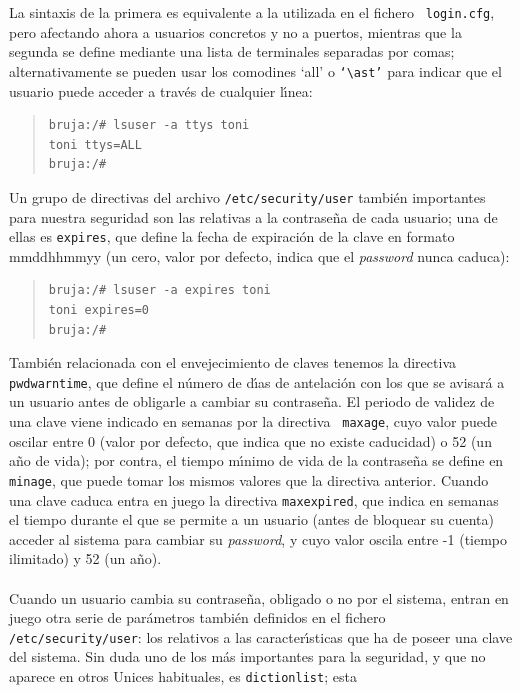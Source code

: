 La sintaxis de la primera es equivalente a la utilizada en el fichero {\tt 
login.cfg}, pero afectando ahora a usuarios concretos y no a puertos, mientras
que la segunda se define mediante una lista de terminales separadas por comas;
alternativamente se pueden usar los comodines {\sc `all'} o {\tt `$\ast$'} para
indicar que el usuario puede acceder a trav\'es de cualquier l\'{\i}nea:
\begin{quote}
\begin{verbatim}
bruja:/# lsuser -a ttys toni
toni ttys=ALL
bruja:/#
\end{verbatim}
\end{quote}
Un grupo de directivas del archivo {\tt /etc/security/user} tambi\'en 
importantes para nuestra seguridad son las relativas a la contrase\~na de cada
usuario; una de ellas es {\tt expires}, que define la fecha de expiraci\'on de
la clave en formato {\sc mmddhhmmyy} (un cero, valor por defecto, indica que el 
{\it password} nunca caduca):
\begin{quote}
\begin{verbatim}
bruja:/# lsuser -a expires toni
toni expires=0
bruja:/#
\end{verbatim}
\end{quote}
Tambi\'en relacionada con el envejecimiento de claves tenemos la directiva
{\tt pwdwarntime}, que define el n\'umero de d\'{\i}as de antelaci\'on con los 
que se avisar\'a a un usuario antes de obligarle a cambiar su contrase\~na. El
periodo de validez de una clave viene indicado en semanas por la directiva {\tt 
maxage}, cuyo valor puede oscilar entre 0 (valor por defecto, que indica que no 
existe caducidad) o 52 (un a\~no de vida); por contra, el tiempo m\'{\i}nimo de 
vida de la contrase\~na se define en {\tt minage}, que puede tomar los mismos 
valores que la directiva anterior. Cuando una clave caduca entra en juego la
directiva {\tt maxexpired}, que indica en semanas el tiempo durante el que se
permite a un usuario (antes de bloquear su cuenta) acceder al sistema para 
cambiar su {\it password}, y cuyo valor oscila entre -1 (tiempo ilimitado) y
52 (un a\~no).\\
\\Cuando un usuario cambia su contrase\~na, obligado o no por el sistema, entran
en juego otra serie de par\'ametros tambi\'en definidos en el fichero {\tt
/etc/security/user}: los relativos a las caracter\'{\i}sticas que ha de poseer
una clave del sistema. Sin duda uno de los m\'as importantes para la seguridad,
y que no aparece en otros Unices habituales, es {\tt dictionlist}; esta
